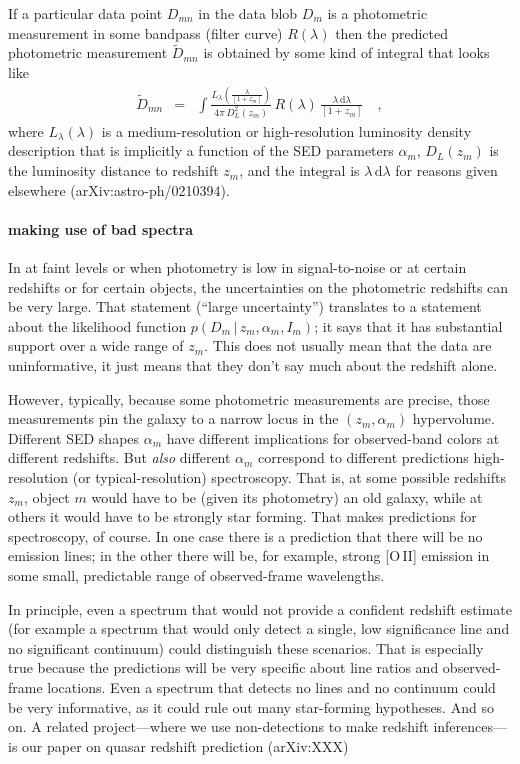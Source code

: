 \documentclass[12pt]{article}
\newcommand{\given}{\,|\,}
\newcommand{\dd}{\mathrm d}
\begin{document}
If a particular data point $D_{mn}$ in the data blob $D_m$ is a
photometric measurement in some bandpass (filter curve) $R(\lambda)$
then the predicted photometric measurement $\tilde{D}_{mn}$ is
obtained by some kind of integral that looks like
\begin{eqnarray}\displaystyle
\tilde{D}_{mn} &=& \int \frac{L_{\lambda}(\frac{\lambda}{[1+z_m]})}{4\pi\,D_L^2(z_m)}\,R(\lambda)\,\frac{\lambda\,\dd\lambda}{[1+z_m]}
\quad ,
\end{eqnarray}
where $L_{\lambda}(\lambda)$ is a medium-resolution or high-resolution
luminosity density description that is implicitly a function of the
SED parameters $\alpha_m$, $D_L(z_m)$ is the luminosity distance to
redshift $z_m$, and the integral is $\lambda\,\dd\lambda$ for reasons
given elsewhere (arXiv:astro-ph/0210394).

\paragraph{making use of bad spectra}
In at faint levels or when photometry is low in signal-to-noise or at
certain redshifts or for certain objects, the uncertainties on the
photometric redshifts can be very large.  That statement (``large
uncertainty'') translates to a statement about the likelihood function
$p(D_m \given z_m, \alpha_m, I_m)$; it says that it has substantial
support over a wide range of $z_m$.  This does not usually mean that
the data are uninformative, it just means that they don't say much
about the redshift alone.

However, typically, because some photometric measurements are precise,
those measurements pin the galaxy to a narrow locus in the
$(z_m,\alpha_m)$ hypervolume.  Different SED shapes $\alpha_m$ have
different implications for observed-band colors at different
redshifts.  But \emph{also} different $\alpha_m$ correspond to
different predictions high-resolution (or typical-resolution)
spectroscopy.  That is, at some possible redshifts $z_m$, object $m$
would have to be (given its photometry) an old galaxy, while at others
it would have to be strongly star forming.  That makes predictions for
spectroscopy, of course.  In one case there is a prediction that there
will be no emission lines; in the other there will be, for example,
strong [O\,II] emission in some small, predictable range of
observed-frame wavelengths.

In principle, even a spectrum that would not provide a confident
redshift estimate (for example a spectrum that would only detect a
single, low significance line and no significant continuum) could
distinguish these scenarios.  That is especially true because the
predictions will be very specific about line ratios and observed-frame
locations.  Even a spectrum that detects no lines and no continuum
could be very informative, as it could rule out many star-forming
hypotheses.  And so on.  A related project---where we use
non-detections to make redshift inferences---is our paper on quasar
redshift prediction (arXiv:XXX)
\end{document}

